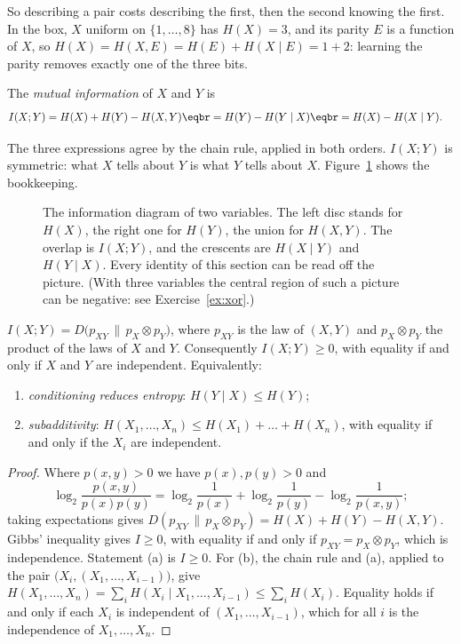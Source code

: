 So describing a pair costs describing the first, then the second knowing the first. In the box, $X$ uniform on $\{1,\dots,8\}$ has $H(X)=3$, and its parity $E$ is a function of $X$, so $H(X)=H(X,E)=H(E)+H(X\mid E)=1+2$: learning the parity removes exactly one of the three bits.

\begin{definition}\label{def:mutual}
The \emph{mutual information} of $X$ and $Y$ is
\[
\begin{aligned}I(X;Y)&=H(X)+H(Y)-H(X,Y)\eqbr=H(Y)-H(Y\mid X)\eqbr=H(X)-H(X\mid Y).\end{aligned}
\]
\end{definition}

The three expressions agree by the chain rule, applied in both orders. $I(X;Y)$ is symmetric: what $X$ tells about $Y$ is what $Y$ tells about $X$. Figure~\ref{fig:venn} shows the bookkeeping.

\begin{figure}[ht]
\centering
{}
\caption{The information diagram of two variables. The left disc stands for $H(X)$, the right one for $H(Y)$, the union for $H(X,Y)$. The overlap is $I(X;Y)$, and the crescents are $H(X\mid Y)$ and $H(Y\mid X)$. Every identity of this section can be read off the picture. (With three variables the central region of such a picture can be negative: see Exercise~\ref{ex:xor}.)}
\label{fig:venn}
\end{figure}

\begin{theorem}\label{thm:mutualpos}
$I(X;Y)=D\bigl(p_{XY}\,\|\,p_X\otimes p_Y\bigr)$, where $p_{XY}$ is the law of $(X,Y)$ and $p_X\otimes p_Y$ the product of the laws of $X$ and $Y$. Consequently $I(X;Y)\ge0$, with equality if and only if $X$ and $Y$ are independent. Equivalently:
\begin{enumerate}[label=(\alph*)]
\item \emph{conditioning reduces entropy}: $H(Y\mid X)\le H(Y)$;
\item \emph{subadditivity}: $H(X_1,\dots,X_n)\le H(X_1)+\dots+H(X_n)$, with equality if and only if the $X_i$ are independent.
\end{enumerate}
\end{theorem}

\begin{proof}
Where $p(x,y)>0$ we have $p(x),p(y)>0$ and
\[
\log_2\frac{p(x,y)}{p(x)p(y)}=\log_2\frac1{p(x)}+\log_2\frac1{p(y)}-\log_2\frac1{p(x,y)};
\]
taking expectations gives $D(p_{XY}\,\|\,p_X\otimes p_Y)=H(X)+H(Y)-H(X,Y)$. Gibbs' inequality gives $I\ge0$, with equality if and only if $p_{XY}=p_X\otimes p_Y$, which is independence. Statement (a) is $I\ge0$. For (b), the chain rule and (a), applied to the pair $\bigl(X_i,(X_1,\dots,X_{i-1})\bigr)$, give $H(X_1,\dots,X_n)=\sum_iH(X_i\mid X_1,\dots,X_{i-1})\le\sum_iH(X_i)$. Equality holds if and only if each $X_i$ is independent of $(X_1,\dots,X_{i-1})$, which for all $i$ is the independence of $X_1,\dots,X_n$.
\end{proof}

